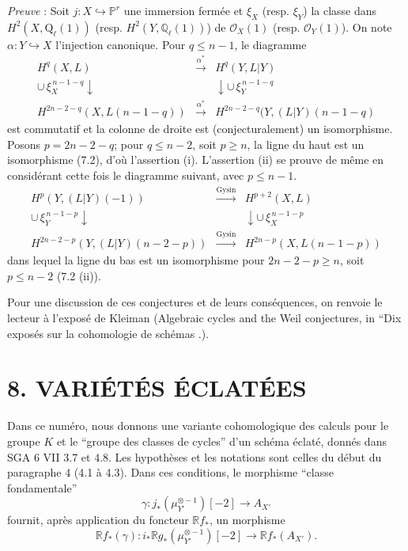 \documentclass[11pt]{article}
\newcommand{\R}{\mathbb{R}}\newcommand{\RHomCore}{\mathbb{R}\mathrm{Hom}}
\providecommand{\R}{\mathrm R}
\begin{document}
\emph{Preuve} : Soit $j:X\hookrightarrow\mathbb P^r$ une immersion fermée et $\xi_X$ (resp. $\xi_Y$) la classe dans $H^2(X,\mathrm{Q}_\ell(1))$ (resp. $H^2(Y,\mathbb Q_\ell(1))$) de $\mathcal O_X(1)$ (resp. $\mathcal O_Y(1)$). On note $\alpha:Y\hookrightarrow X$ l'injection canonique. Pour $q\le n-1$, le diagramme
\[
\begin{array}{ccc}
H^q(X,L)&\xrightarrow{\alpha^*}&H^q(Y,L|Y)\\
\cup\,\xi_X^{\,n-1-q}\downarrow&&\downarrow\cup\,\xi_Y^{\,n-1-q}\\
H^{2n-2-q}(X,L(n-1-q))&\xrightarrow{\alpha^*}&
H^{2n-2-q}(Y,(L|Y)(n-1-q)
\end{array}
\]
est commutatif et la colonne de droite est (conjecturalement) un isomorphisme. Posons $p=2n-2-q$; pour $q\le n-2$, soit $p\ge n$, la ligne du haut est un isomorphisme (7.2), d'où l'assertion (i). L'assertion (ii) se prouve de même en considérant cette fois le diagramme suivant, avec $p\le n-1$.
\[
\begin{array}{ccc}
H^p(Y,(L|Y)(-1))&
\xrightarrow{\mathrm{Gysin}}&H^{p+2}(X,L)\\
\cup\,\xi_Y^{\,n-1-p}\downarrow&&\downarrow\cup\,\xi_X^{\,n-1-p}\\
H^{2n-2-p}(Y,(L|Y)(n-2-p))&\xrightarrow{\mathrm{Gysin}}&
H^{2n-p}(X,L(n-1-p))
\end{array}
\]
dans lequel la ligne du bas est un isomorphisme pour $2n-2-p\ge n$, soit $p\le n-2$ (7.2 (ii)).

Pour une discussion de ces conjectures et de leurs conséquences, on renvoie le lecteur à l'exposé de Kleiman (Algebraic cycles and the Weil conjectures, in ``Dix exposés sur la cohomologie de schémas .).

\section*{8. VARIÉTÉS ÉCLATÉES}

Dans ce numéro, nous donnons une variante cohomologique des calculs pour le groupe $K$ et le ``groupe des classes de cycles'' d'un schéma éclaté, donnés dans SGA 6 VII 3.7 et 4.8. Les hypothèses et les notations sont celles du début du paragraphe 4 (4.1 à 4.3). Dans ces conditions, le morphisme ``classe fondamentale''
\[
\gamma:j_*(\mu_{Y'}^{\otimes -1})[-2]\to A_{X'}
\]
fournit, après application du foncteur $\R f_*$, un morphisme
\[
\R f_*(\gamma):i_*\R g_*(\mu_{Y'}^{\otimes -1})[-2]\to \R f_*(A_{X'}).
\]
\end{document}
